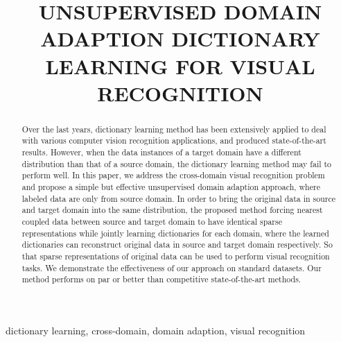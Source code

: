\documentclass{article}
\title{UNSUPERVISED DOMAIN ADAPTION DICTIONARY LEARNING FOR VISUAL RECOGNITION}
\begin{document}
%
\maketitle
%


\begin{abstract}


Over the last years, dictionary learning method has been extensively applied to deal with various computer vision recognition applications, and produced state-of-the-art results. However, when the data instances of a target domain have a different distribution than that of a source domain, the dictionary learning method may fail to perform well. In this paper, we address the cross-domain visual recognition problem and propose a simple but effective unsupervised domain adaption approach, where labeled data are only from source domain.  In order to bring the original data in source and target domain into the same distribution, the proposed method forcing nearest coupled data  between source and target domain to have identical sparse representations while jointly learning dictionaries for each domain, where the learned dictionaries can reconstruct original data in source and target domain respectively. So that sparse representations of original data can be used to perform visual recognition tasks. We demonstrate the effectiveness of our approach on standard datasets. Our method performs on par or better than competitive state-of-the-art methods.

\end{abstract}
%
\begin{keywords}
dictionary learning, cross-domain, domain adaption, visual recognition
\end{keywords}
%
\end{document}
